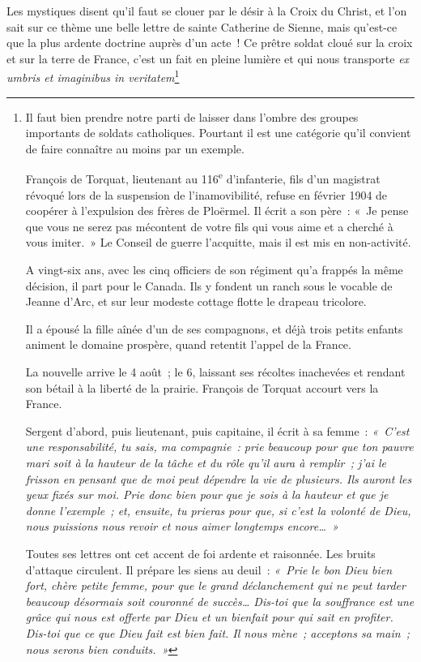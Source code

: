 \documentclass[french,twoside]{book} %
\begin{document}
\noindent Les mystiques disent qu’il faut se clouer par le désir à la Croix du Christ, et l’on sait sur ce thème une belle lettre de sainte Catherine de Sienne, mais qu’est-ce que la plus ardente doctrine auprès d’un acte ! Ce prêtre soldat cloué sur la croix et sur la terre de France, c’est un fait en pleine lumière et qui nous transporte {\itshape ex umbris et imaginibus in veritatem}\footnote{\noindent Il faut bien prendre notre parti de laisser dans l’ombre des groupes importants de soldats catholiques. Pourtant il est une catégorie qu’il convient de faire connaître au moins par un exemple.‌\par
 François de Torquat, lieutenant au 116\textsuperscript{e} d’infanterie, fils d’un magistrat révoqué lors de la suspension de l’inamovibilité, refuse en février 1904 de coopérer à l’expulsion des frères de Ploërmel. Il écrit a son père : « Je pense que vous ne serez pas mécontent de votre fils qui vous aime et a cherché à vous imiter. » Le Conseil de guerre l’acquitte, mais il est mis en non-activité.‌\par
 A vingt-six ans, avec les cinq officiers de son régiment qu’a frappés la même décision, il part pour le Canada. Ils y fondent un ranch sous le vocable de Jeanne d’Arc, et sur leur modeste cottage flotte le drapeau tricolore.‌\par
 Il a épousé la fille aînée d’un de ses compagnons, et déjà trois petits enfants animent le domaine prospère, quand retentit l’appel de la France.‌\par
 La nouvelle arrive le 4 août ; le 6, laissant ses récoltes inachevées et rendant son bétail à la liberté de la prairie. François de Torquat accourt vers la France.‌\par
 Sergent d’abord, puis lieutenant, puis capitaine, il écrit à sa femme : \emph{« C’est une responsabilité, tu sais, ma compagnie : prie beaucoup pour que ton pauvre mari soit à la hauteur de la tâche et du rôle qu’il aura à remplir ; j’ai le frisson en pensant que de moi peut dépendre la vie de plusieurs. Ils auront les yeux fixés sur moi. Prie donc bien pour que je sois à la hauteur et que je donne l’exemple ; et, ensuite, tu prieras pour que, si c’est la volonté de Dieu, nous puissions nous revoir et nous aimer longtemps encore… »}‌\par
 Toutes ses lettres ont cet accent de foi ardente et raisonnée. Les bruits d’attaque circulent. Il prépare les siens au deuil : \emph{« Prie le bon Dieu bien fort, chère petite femme, pour que le grand déclanchement qui ne peut tarder beaucoup désormais soit couronné de succès… Dis-toi que la souffrance est une grâce qui nous est offerte par Dieu et un bienfait pour qui sait en profiter. Dis-toi que ce que Dieu fait est bien fait. Il nous mène ; acceptons sa main ; nous serons bien conduits. »}‌\par
}
\end{document}
